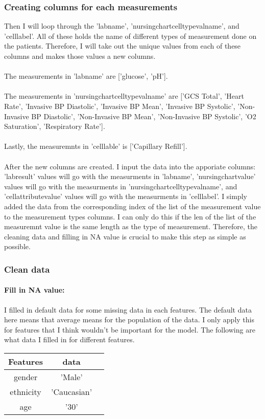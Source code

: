 \documentclass{article}
\begin{document}
\subsubsection{Creating columns for each measurements}
Then I will loop through the 'labname', 'nursingchartcelltypevalname', and 'celllabel'. All of these holds the name of different types of measurement done on the patients. Therefore, I will take out the unique values from each of these columns and makes those values a new columns. \\ \\ 
The measurements in 'labname' are ['glucose', 'pH']. \\ \\
The measurements in 'nursingchartcelltypevalname' are 
['GCS Total', 'Heart Rate', 'Invasive BP Diastolic', 'Invasive BP Mean', 'Invasive BP Systolic', 'Non-Invasive BP Diastolic', 'Non-Invasive BP Mean', 'Non-Invasive BP Systolic', 'O2 Saturation', 'Respiratory Rate']. \\ \\ 
Lastly, the measuremnts in 'celllable' is ['Capillary Refill']. \\ \\
After the new columns are created. I input the data into the apporiate columns: 'labresult' values will go with the measurments in 'labname', 'nursingchartvalue' values will go with the measurments in 'nursingchartcelltypevalname', and 'cellattributevalue' values will go with the measurments in 'celllabel'. I simply added the data from the corresponding index of the list of the measurement value to the measurement types columns. I can only do this if the len of the list of the measuremnt value is the same length as the type of measurement. Therefore, the cleaning data and filling in NA value is crucial to make this step as simple as possible. 
\subsubsection{Clean data}
 \paragraph{Fill in NA value:}
I filled in default data for some missing data in each features. The default data here means that average means for the population of the data. I only apply this for features that I think wouldn't be important for the model. The following are what data I filled in for different features.
\begin{tabular}{|c|c|c|}
\hline
Features  & data\\
\hline
gender & 'Male'\\
\hline
ethnicity & 'Caucasian' \\
\hline
age & '30' \\
\hline
\end{tabular}
\end{document}
